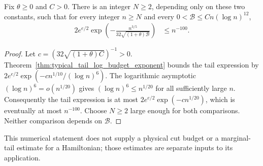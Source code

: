 \begin{theorem}
\label{thm:typical_tail_log_budget}
\leanok
Fix $\theta\ge0$ and $C>0$. There is an integer $N\ge2$, depending only
on these two constants, such that for every integer $n\ge N$ and every
$0<\mathcal B\le Cn(\log n)^{12}$,
\begin{align}
2e^{e/2}\exp\!\left(-\frac{n^{3/5}}
 {32\sqrt{(1+\theta)\mathcal B}}\right)&\le n^{-100}.
\end{align}
\end{theorem}
\begin{proof}
\leanok
{}
Let $c=(32\sqrt{(1+\theta)C})^{-1}>0$.
Theorem~\ref{thm:typical_tail_log_budget_exponent} bounds the tail expression
by $2e^{e/2}\exp(-cn^{1/10}/(\log n)^6)$.
The logarithmic asymptotic $(\log n)^6=o(n^{1/20})$ gives
$(\log n)^6\le n^{1/20}$ for all sufficiently large $n$.
Consequently the tail expression is at most
$2e^{e/2}\exp(-cn^{1/20})$, which is eventually at most $n^{-100}$.
Choose $N\ge2$ large enough for both comparisons. Neither comparison
depends on $\mathcal B$.
\end{proof}

This numerical statement does not supply a physical cut budget or a
marginal-tail estimate for a Hamiltonian; those estimates are separate
inputs to its application.
